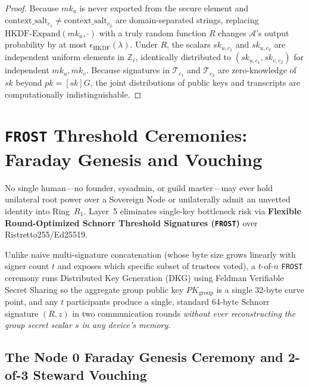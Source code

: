 \begin{proof}
Because $mk_u$ is never exported from the secure element and $\mathrm{context\_salt}_{c_1} \neq
\mathrm{context\_salt}_{c_2}$ are domain-separated strings, replacing
$\mathrm{HKDF\text{-}Expand}(mk_u, \cdot)$ with a truly random function $R$ changes $\mathcal{A}$'s
output probability by at most $\epsilon_{\mathrm{HKDF}}(\lambda)$. Under $R$, the scalars
$sk_{u,c_1}$ and $sk_{u,c_2}$ are independent uniform elements in $\mathbb{Z}_\ell$, identically
distributed to $(sk_{u,c_1}, sk_{v,c_2})$ for independent $mk_u, mk_v$. Because signatures in
$\mathcal{T}_{c_1}$ and $\mathcal{T}_{c_2}$ are zero-knowledge of $sk$ beyond $pk = [sk]G$, the
joint distributions of public keys and transcripts are computationally indistinguishable.
\end{proof}

\section{\texttt{FROST} Threshold Ceremonies: Faraday Genesis and Vouching}
\label{sec:ch2-frost-ceremonies}

No single human---no founder, sysadmin, or guild master---may ever hold unilateral root power
over a Sovereign Node or unilaterally admit an unvetted identity into Ring~$R_1$. Layer~5
eliminates single-key bottleneck risk via \textbf{Flexible Round-Optimized Schnorr Threshold
Signatures (\texttt{FROST})} \parencite{komlo2020frost} over Ristretto255/Ed25519.

Unlike naive multi-signature concatenation (whose byte size grows linearly with signer count $t$
and exposes which specific subset of trustees voted), a $t$-of-$n$ \texttt{FROST} ceremony runs
Distributed Key Generation (DKG) using Feldman Verifiable Secret Sharing so the aggregate group
public key $PK_{\mathrm{group}}$ is a single 32-byte curve point, and any $t$ participants
produce a single, standard 64-byte Schnorr signature $(R, z)$ in two communication rounds
\textit{without ever reconstructing the group secret scalar $s$ in any device's memory}.

\subsection{The Node 0 Faraday Genesis Ceremony and 2-of-3 Steward Vouching}

